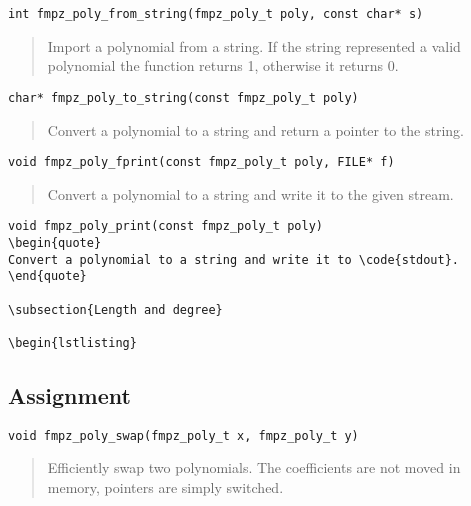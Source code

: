 \documentclass[a4paper,10pt]{article}
\newcommand{\code}{\lstinline}
\begin{document}
\begin{lstlisting}
int fmpz_poly_from_string(fmpz_poly_t poly, const char* s)
\end{lstlisting}
\begin{quote}
Import a polynomial from a string. If the string represented a valid polynomial the function returns 1, otherwise it returns 0.
\end{quote}

\begin{lstlisting}
char* fmpz_poly_to_string(const fmpz_poly_t poly)
\end{lstlisting}
\begin{quote}
Convert a polynomial to a string and return a pointer to the string. \end{quote}

\begin{lstlisting}
void fmpz_poly_fprint(const fmpz_poly_t poly, FILE* f)\end{lstlisting}
\begin{quote}
Convert a polynomial to a string and write it to the given stream. 
\end{quote}

\begin{lstlisting}
void fmpz_poly_print(const fmpz_poly_t poly)
\begin{quote}
Convert a polynomial to a string and write it to \code{stdout}. 
\end{quote}

\subsection{Length and degree}

\begin{lstlisting}
\end{lstlisting}
\begin{quote}
\end{quote}


\subsection{Assignment}

\begin{lstlisting}
void fmpz_poly_swap(fmpz_poly_t x, fmpz_poly_t y)
\end{lstlisting}
\begin{quote}
Efficiently swap two polynomials. The coefficients are not moved in memory, pointers are simply switched. 
\end{quote}
\end{document}
